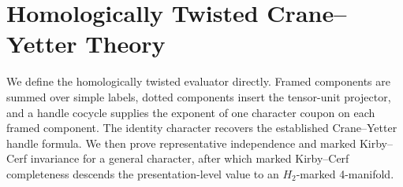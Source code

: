 \section{Homologically Twisted Crane--Yetter Theory}
\label{sec:evaluator}
\label{sec:twisted-evaluator}

We define the homologically twisted evaluator directly.  Framed components
are summed over simple labels, dotted components insert the tensor-unit
projector, and a handle cocycle supplies the exponent of one character coupon
on each framed component.  The identity character recovers the established
Crane--Yetter handle formula.  We then prove representative independence and
marked Kirby--Cerf invariance for a general character, after which marked
Kirby--Cerf completeness descends the presentation-level value to an
\(H_2\)-marked 4-manifold.




